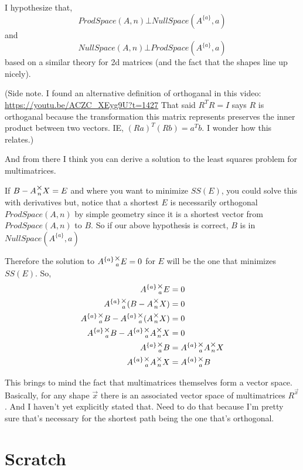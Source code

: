 \documentclass[12pt]{book}
\theoremstyle{plain}
\theoremstyle{definition}
\theoremstyle{ppart}
\theoremstyle{case}
\theoremstyle{solution}
\newcommand{\mmult}[1]{\text{\raisebox{1ex}{$\underset{#1}{\times}$}}}
\newcommand{\transpose}[2]{{#1}^{\{#2\}}}
\begin{document}
\begin{appendices}
I hypothesize that,
\[ProdSpace(A, n) \bot NullSpace(\transpose{A}{a}, a)\]
and
\[NullSpace(A, n) \bot ProdSpace(\transpose{A}{a}, a)\]
based on a similar theory for 2d matrices \cite{youtube:orthogonal} (and the fact that the shapes line up nicely).

(Side note. I found an alternative definition of orthoganal in this video: \url{https://youtu.be/ACZC_XEyg9U?t=1427}
That said $R^TR = I$ says $R$ is orthoganal because the transformation this matrix represents preserves the inner product
between two vectors. IE, $(Ra)^T(Rb) = a^Tb$. I wonder how this relates.)

And from there I think you can derive a solution to the least squares problem for multimatrices.

If $B - A \mmult{n} X = E$ and where you want to minimize $SS(E)$, you could solve this with derivatives
but, notice that a shortest $E$ is necessarily orthogonal $ProdSpace(A,n)$ by simple geometry since it is a shortest
vector from $ProdSpace(A,n)$ to $B$. So if our above hypothesis is correct, $B$ is in $NullSpace(\transpose{A}{a}, a)$

Therefore the solution to $\transpose{A}{a} \mmult{a} E = 0$ for $E$ will be the one that minimizes $SS(E)$. So,
\begin{align*}
  \transpose{A}{a} \mmult{a} E &= 0 \\
  \transpose{A}{a} \mmult{a} (B - A \mmult{n} X) &= 0 \\
  \transpose{A}{a} \mmult{a} B - \transpose{A}{a} \mmult{a} (A \mmult{n} X) &= 0 \\
  \transpose{A}{a} \mmult{a} B - \transpose{A}{a} \mmult{a} A \mmult{n} X &= 0 \\
  \transpose{A}{a} \mmult{a} B &= \transpose{A}{a} \mmult{a} A \mmult{n} X \\
  \transpose{A}{a} \mmult{a} A \mmult{n} X &= \transpose{A}{a} \mmult{a} B
\end{align*}

This brings to mind the fact that multimatrices themselves form a vector space. Basically, for any shape $\vec{x}$
there is an associated vector space of multimatrices $R^{\vec{x}}$. And I haven't yet explicitly stated that. Need to do
that because I'm pretty sure that's necessary for the shortest path being the one that's orthogonal.

\chapter{Scratch}


\end{appendices}
\end{document}
